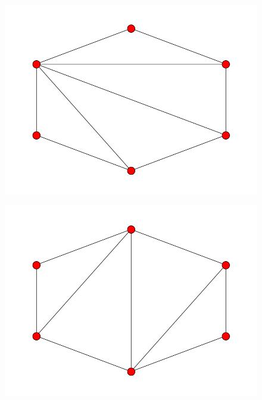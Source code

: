 \documentclass[fontsize=10pt]{article}
\begin{document}
\begin{figure}[hbtp]
\centering
\includegraphics[scale=0.5]{imgs/hexagon/hexagon_6.png}
\end{figure}

\begin{figure}[hbtp]
\centering
\includegraphics[scale=0.5]{imgs/hexagon/hexagon_7.png}
\end{figure}
\end{document}
